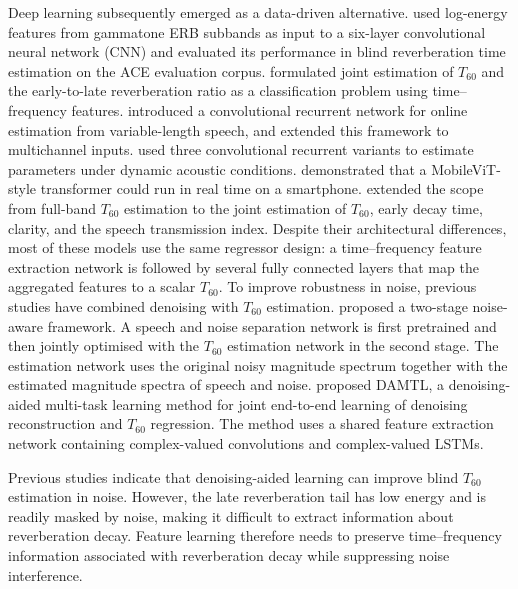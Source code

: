 \documentclass[a4paper,fleqn]{cas-sc}
\begin{document}
Deep learning subsequently emerged as a data-driven alternative. \citet{gamper2018cnn} used log-energy features from gammatone ERB subbands as input to a six-layer convolutional neural network (CNN) and evaluated its performance in blind reverberation time estimation on the ACE evaluation corpus. \citet{xiong2018ercnn} formulated joint estimation of $T_{60}$ and the early-to-late reverberation ratio as a classification problem using time--frequency features. \citet{deng2020crnn} introduced a convolutional recurrent network for online estimation from variable-length speech, and \citet{srivastava2021blindroom} extended this framework to multichannel inputs. \citet{goetz2023online} used three convolutional recurrent variants to estimate parameters under dynamic acoustic conditions. \citet{saini2023mobileaudiotransformer} demonstrated that a MobileViT-style transformer could run in real time on a smartphone. \citet{duangpummet2022stochastic} extended the scope from full-band $T_{60}$ estimation to the joint estimation of $T_{60}$, early decay time, clarity, and the speech transmission index. Despite their architectural differences, most of these models use the same regressor design: a time--frequency feature extraction network is followed by several fully connected layers that map the aggregated features to a scalar $T_{60}$. To improve robustness in noise, previous studies have combined denoising with $T_{60}$ estimation. \citet{zheng2022noiseaware} proposed a two-stage noise-aware framework. A speech and noise separation network is first pretrained and then jointly optimised with the $T_{60}$ estimation network in the second stage. The estimation network uses the original noisy magnitude spectrum together with the estimated magnitude spectra of speech and noise. \citet{zhang2024damtl} proposed DAMTL, a denoising-aided multi-task learning method for joint end-to-end learning of denoising reconstruction and $T_{60}$ regression. The method uses a shared feature extraction network containing complex-valued convolutions and complex-valued LSTMs.



Previous studies indicate that denoising-aided learning can improve blind $T_{60}$ estimation in noise. However, the late reverberation tail has low energy and is readily masked by noise, making it difficult to extract information about reverberation decay. Feature learning therefore needs to preserve time--frequency information associated with reverberation decay while suppressing noise interference.
\end{document}

